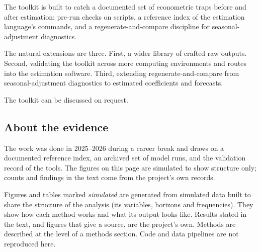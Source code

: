 \documentclass[
  british,
  a4paper,
]{article}
\begin{document}
The toolkit is built to catch a documented set of econometric traps
before and after estimation: pre-run checks on scripts, a reference
index of the estimation language's commands, and a
regenerate-and-compare discipline for seasonal-adjustment diagnostics.

The natural extensions are three. First, a wider library of crafted raw
outputs. Second, validating the toolkit across more computing
environments and routes into the estimation software. Third, extending
regenerate-and-compare from seasonal-adjustment diagnostics to estimated
coefficients and forecasts.

The toolkit can be discussed on request.

\subsection{About the evidence}\label{about-the-evidence}

The work was done in 2025--2026 during a career break and draws on a
documented reference index, an archived set of model runs, and the
validation record of the tools. The figures on this page are simulated
to show structure only; counts and findings in the text come from the
project's own records.

Figures and tables marked \emph{simulated} are generated from simulated
data built to share the structure of the analysis (its variables,
horizons and frequencies). They show how each method works and what its
output looks like. Results stated in the text, and figures that give a
source, are the project's own. Methods are described at the level of a
methods section. Code and data pipelines are not reproduced here.
\end{document}

